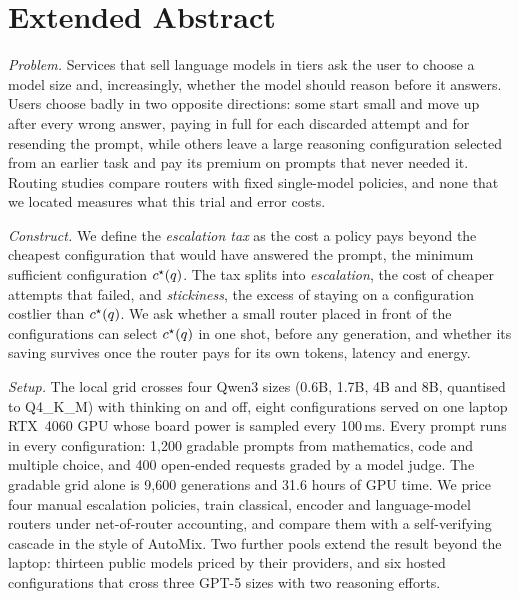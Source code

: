 \section*{Extended Abstract}
\label{sec:extended-abstract}

\emph{Problem.} Services that sell language models in tiers ask the user
to choose a model size and, increasingly, whether the model should reason
before it answers. Users choose badly in two opposite directions: some start
small and move up after every wrong answer, paying in full for each
discarded attempt and for resending the prompt, while others leave a large
reasoning configuration selected from an earlier task and pay its premium on
prompts that never needed it. Routing studies compare routers with fixed
single-model policies, and none that we located measures what this trial and
error costs.

\emph{Construct.} We define the \emph{escalation tax} as the cost a policy
pays beyond the cheapest configuration that would have answered the prompt,
the minimum sufficient configuration $c^{\star}(q)$. The tax splits into
\emph{escalation}, the cost of cheaper attempts that failed, and
\emph{stickiness}, the excess of staying on a configuration costlier than
$c^{\star}(q)$. We ask whether a small router placed in front of the
configurations can select $c^{\star}(q)$ in one shot, before any generation,
and whether its saving survives once the router pays for its own tokens,
latency and energy.

\emph{Setup.} The local grid crosses four Qwen3 sizes (0.6B, 1.7B, 4B and
8B, quantised to Q4\_K\_M) with thinking on and off, eight configurations
served on one laptop RTX~4060 GPU whose board power is sampled every
100\,ms. Every prompt runs in every configuration: 1{,}200 gradable prompts
from mathematics, code and multiple choice, and 400 open-ended requests
graded by a model judge. The gradable grid alone is 9{,}600 generations and
31.6 hours of GPU time. We price four manual escalation policies, train
classical, encoder and language-model routers under net-of-router
accounting, and compare them with a self-verifying cascade in the style of
AutoMix. Two further pools extend the result beyond the laptop: thirteen
public models priced by their providers, and six hosted configurations that
cross three GPT-5 sizes with two reasoning efforts.


